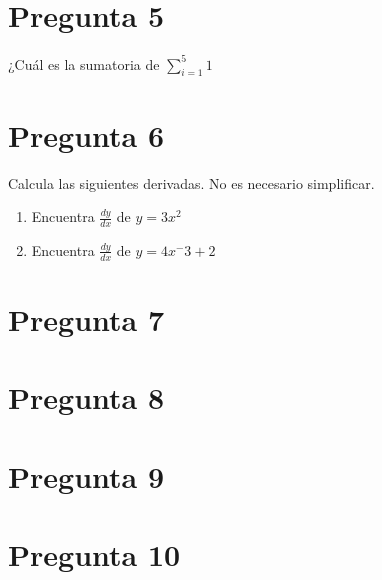 \documentclass[]{article}
\begin{document}
\section*{Pregunta 5}
¿Cuál es la sumatoria de $\sum_{i=1}^{5}1$
\section*{Pregunta 6}
Calcula las siguientes derivadas. No es necesario simplificar.

\begin{enumerate}[label=(\alph*)]
	\item Encuentra $\frac{dy}{dx}$ de $y=3x^2$
	\item Encuentra $\frac{dy}{dx}$ de $y=4x^-3+2$
\end{enumerate}



\section*{Pregunta 7}

\section*{Pregunta 8}

\section*{Pregunta 9}

\section*{Pregunta 10}
\end{document}
